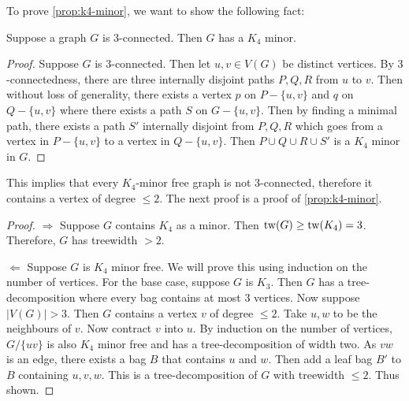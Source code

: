 To prove \cref{prop:k4-minor}, we want to show the following fact:
\begin{lemma}
	Suppose a graph $G$ is $3$-connected. Then $G$ has a $K_4$ minor. 
\end{lemma}
\begin{proof}
	Suppose $G$ is $3$-connected. Then let $u, v \in V(G)$ be distinct vertices. By $3$-connectedness, there are three internally disjoint paths $P, Q, R$ from $u$ to $v$. Then without loss of generality, there exists a vertex $p$ on $P -\{u, v\}$ and $q$ on $Q -\{u, v\}$ where there exists a path $S$ on $G - \{u, v\}$. Then by finding a minimal path, there exists a path $S'$ internally disjoint from $P, Q, R$ which goes from a vertex in $P - \{u, v\}$ to a vertex in $Q - \{u, v\}$. Then $P \cup Q \cup R \cup S'$ is a $K_4$ minor in $G$. 
\end{proof}

This implies that every $K_4$-minor free graph is not $3$-connected, therefore it contains a vertex of degree $\leq 2$. The next proof is a proof of \cref{prop:k4-minor}.

\begin{proof}
	$\Rightarrow$ Suppose $G$ contains $K_4$ as a minor. Then $\operatorname{tw}(G) \geq \operatorname{tw}(K_4) = 3$. Therefore, $G$ has treewidth $> 2$. 

	$\Leftarrow$ Suppose $G$ is $K_4$ minor free. We will prove this using induction on the number of vertices. For the base case, suppose $G$ is $K_3$. Then $G$ has a tree-decomposition where every bag contains at most $3$ vertices. Now suppose $|V(G)| > 3$. Then $G$ contains a vertex $v$ of degree $\leq 2$. Take $u, w$ to be the neighbours of $v$. Now contract $v$ into $u$. By induction on the number of vertices, $G / \{uv\}$ is also $K_4$ minor free and has a tree-decomposition of width two. As $vw$ is an edge, there exists a bag $B$ that contains $u$ and $w$. Then add a leaf bag $B'$ to $B$ containing $u, v, w$. This is a tree-decomposition of $G$ with treewidth $\leq 2$. Thus shown. 
\end{proof}


